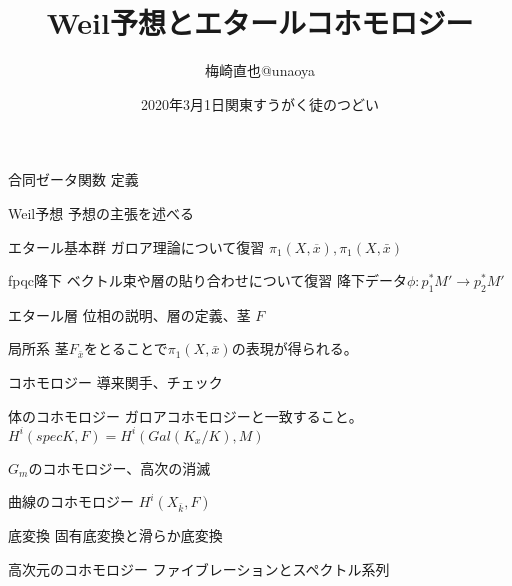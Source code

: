 \documentclass[dvipdfmx]{beamer}
\title{Weil予想とエタールコホモロジー}
\author{梅崎直也@unaoya}
\date{2020年3月1日関東すうがく徒のつどい}
\begin{document}
\begin{frame}
  \maketitle
\end{frame}

\begin{frame}{合同ゼータ関数}
  定義
\end{frame}

\begin{frame}{Weil予想}
  予想の主張を述べる
\end{frame}

\begin{frame}{エタール基本群}
  ガロア理論について復習
  $\pi_1(X,\overline{x}), \pi_1(X,\bar{x})$
\end{frame}

\begin{frame}{fpqc降下}
  ベクトル束や層の貼り合わせについて復習
  降下データ$\phi:p_1^*M'\to p_2^*M'$
\end{frame}

\begin{frame}{エタール層}
  位相の説明、層の定義、茎
  $F$
\end{frame}

\begin{frame}{局所系}
  茎$F_{\bar{x}}$をとることで$\pi_1(X,\bar{x})$の表現が得られる。
\end{frame}

\begin{frame}{コホモロジー}
  導来関手、チェック
\end{frame}

\begin{frame}{体のコホモロジー}
  ガロアコホモロジーと一致すること。
  $H^i(specK,F)=H^i(Gal(K_x/K),M)$

  $G_m$のコホモロジー、高次の消滅
\end{frame}

\begin{frame}{曲線のコホモロジー}
  $H^i(X_{\bar{k}},F)$
\end{frame}

\begin{frame}{底変換}
  固有底変換と滑らか底変換
\end{frame}

\begin{frame}{高次元のコホモロジー}
  ファイブレーションとスペクトル系列
\end{frame}
\end{document}
